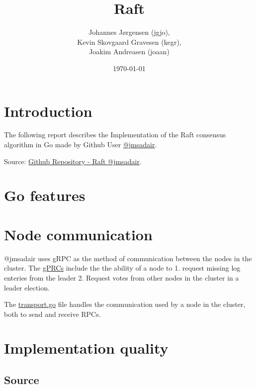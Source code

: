 \documentclass[a4paper,11pt]{article}
\title{Raft}
\author{Johannes Jørgensen (jgjo),\\ Kevin Skovgaard Gravesen (kegr),\\ Joakim Andreasen (joaan)}
\date{\today}
\begin{document}
 

\maketitle

\section*{Introduction}
The following report describes the Implementation of the Raft consensus algorithm in Go made by Github User \href{https://github.com/jmsadair/}{@jmsadair}.


Source: \href{https://github.com/jmsadair/raft}{Github Repository - Raft @jmsadair}.
\\

\section*{Go features}

\section*{Node communication}
@jmsadair uses gRPC as the method of communication between the nodes in the cluster. The \href{https://github.com/jmsadair/raft/blob/dev/internal/protobuf/raft.proto}{gPRCs} include the the ability of a node to 1. request missing log enteries from the leader 2. Request votes from other nodes in the cluster in a leader election. 


The \href{https://github.com/jmsadair/raft/blob/dev/transport.go}{transport.go} file handles the communication used by a node in the cluster, both to send and receive RPCs.

\section*{Implementation quality}

\subsection*{Source}
\end{document}
